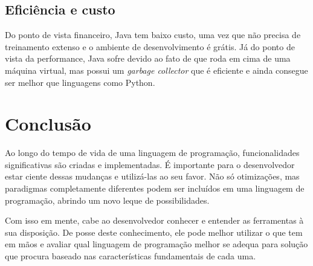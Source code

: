 \documentclass[12pt]{article}
\begin{document}
\subsection{Eficiência e custo}
Do ponto de vista financeiro, Java tem baixo custo, uma vez que não precisa de treinamento extenso e o ambiente de desenvolvimento é grátis. Já do ponto de vista da performance, Java sofre devido ao fato de que roda em cima de uma máquina virtual, mas possui um \textit{garbage collector} que é eficiente e ainda consegue ser melhor que linguagens como Python.


\section{Conclusão}
Ao longo do tempo de vida de uma linguagem de programação, funcionalidades significativas são criadas e implementadas. É importante para o desenvolvedor estar ciente dessas mudanças e utilizá-las ao seu favor. Não só otimizações, mas paradigmas completamente diferentes podem ser incluídos em uma linguagem de programação, abrindo um novo leque de possibilidades.

Com isso em mente, cabe ao desenvolvedor conhecer e entender as ferramentas à sua disposição. De posse deste conhecimento, ele pode melhor utilizar o que tem em mãos e avaliar qual linguagem de programação melhor se adequa para solução que procura baseado nas características fundamentais de cada uma.

\nocite{*}


\end{document}

